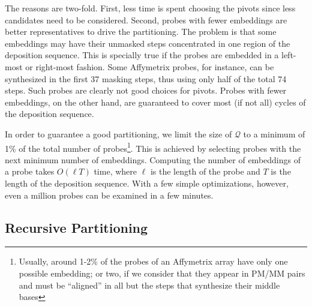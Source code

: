 \documentclass{llncs}
\begin{document}
The reasons are two-fold. First, less time is spent choosing the pivots
since less candidates need to be considered.
Second, probes with fewer embeddings are better representatives to drive
the partitioning. The problem is that some embeddings may have their unmasked steps
concentrated in one region of the deposition sequence. This is specially true if
the probes are embedded in a left-most or right-most fashion.
Some Affymetrix probes, for instance,
can be synthesized in the first 37 masking steps, thus
using only half of the total 74 steps. Such probes are clearly not good choices
for pivots. Probes with fewer embeddings, on the other hand,
are guaranteed to cover most (if not all) cycles of the deposition sequence.

In order to guarantee a good partitioning,
we limit the size of $\mathcal{Q}$ to a minimum of 1\% of the total
number of probes\footnote{Usually, around 1-2\% of the probes of an Affymetrix array
have only one possible embedding; or two, if we consider that they appear in PM/MM
pairs and must be ``aligned'' in all but the steps that synthesize their middle
bases}. This is achieved by selecting probes with the next minimum
number of embeddings.
Computing the number of embeddings of a probe takes $O(\ell T)$ time, where
$\ell$ is the length of the probe and $T$ is the length of the deposition sequence.
With a few simple optimizations, however, even a million probes can be examined in
a few minutes.

\subsection{Recursive Partitioning}
\end{document}
